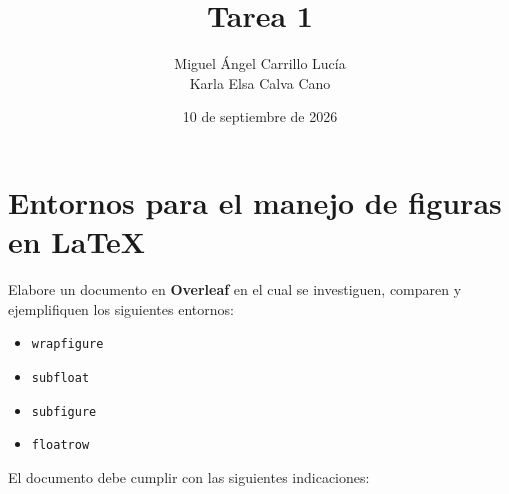 \documentclass{article}
\title{Tarea 1}
\author{Miguel Ángel Carrillo Lucía \\ Karla Elsa Calva Cano}
\date{10 de septiembre de 2026}
\begin{document}
\maketitle
\vspace{-10mm}

\section*{Entornos para el manejo de figuras en \LaTeX}

Elabore un documento en \textbf{Overleaf} en el cual se investiguen, comparen y ejemplifiquen los siguientes entornos:

\begin{itemize}
    \item \texttt{wrapfigure}
    \item \texttt{subfloat}
    \item \texttt{subfigure}
    \item \texttt{floatrow}
\end{itemize}

El documento debe cumplir con las siguientes indicaciones:
\end{document}
